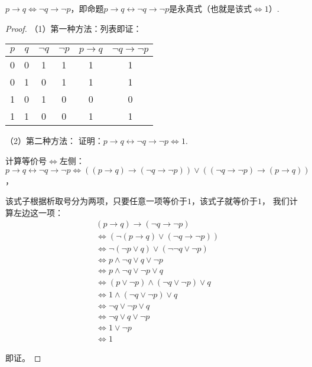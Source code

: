 \begin{theorem}
    $p \to q \iff \neg q \to \neg p$，即命题$p \to q \leftrightarrow \neg q \to \neg p$是永真式（也就是该式$\Leftrightarrow 1$）.
\end{theorem}
\begin{proof}
    （1）第一种方法：列表即证：

    \begin{tabular}{c|c|c|c|c|c}
        $p$ & $q$ & $\neg q$ & $\neg p$ & $p \to q$ & $\neg q \to \neg p$ \\
        \hline
        0 & 0 & 1 & 1 & 1 & 1 \\
        0 & 1 & 0 & 1 & 1 & 1 \\
        1 & 0 & 1 & 0 & 0 & 0 \\
        1 & 1 & 0 & 0 & 1 & 1
    \end{tabular}

    （2）第二种方法：
    证明：$p \to q \leftrightarrow \neg q \to \neg p \Leftrightarrow 1$.

    计算等价号$\Leftrightarrow$左侧：
    $p \to q \leftrightarrow \neg q \to \neg p\Leftrightarrow ((p \to q) \to (\neg q \to \neg p)) \vee ((\neg q \to \neg p) \to (p \to q))$，

    该式子根据析取号分为两项，只要任意一项等价于$1$，该式子就等价于$1$，
    我们计算左边这一项：
    \begin{equation*}
        \begin{aligned}
    & (p \to q) \to (\neg q \to \neg p) \\
    & \Leftrightarrow (\neg (p \to q) \vee (\neg q \to \neg p)) \\
    & \Leftrightarrow \neg (\neg p \vee q) \vee (\neg \neg q \vee \neg p) \\
    & \Leftrightarrow p \wedge \neg q \vee q \vee \neg p  \\
    & \Leftrightarrow p \wedge \neg q \vee \neg p \vee q \\
    & \Leftrightarrow  (p \vee \neg p) \wedge (\neg q \vee \neg p) \vee q \\
    & \Leftrightarrow 1 \wedge (\neg q \vee \neg p) \vee q \\
    & \Leftrightarrow \neg q \vee \neg p \vee q \\
    & \Leftrightarrow \neg q \vee q \vee \neg p \\
    & \Leftrightarrow 1 \vee \neg p \\
    & \Leftrightarrow 1
        \end{aligned}
    \end{equation*}

    即证。
\end{proof}

